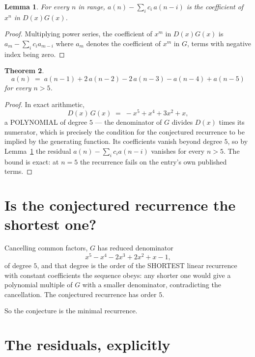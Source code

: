 \documentclass[11pt,a4paper]{article}
\theoremstyle{plain}
\newtheorem{theorem}{Theorem}
\newtheorem{lemma}[theorem]{Lemma}
\theoremstyle{definition}
\begin{document}
\begin{lemma}\label{lem:key}
For every $n$ in range, $a(n)-\sum_i c_i\,a(n-i)$ is the coefficient of $x^{n}$ in
$D(x)G(x)$.
\end{lemma}

\begin{proof}
Multiplying power series, the coefficient of $x^{m}$ in $D(x)G(x)$ is
$a_m-\sum_i c_i a_{m-i}$ where $a_m$ denotes the coefficient of $x^{m}$ in $G$, terms with
negative index being zero.
\end{proof}

\begin{theorem}
\[
a(n)\;=\;a(n-1) + 2\,a(n-2) - 2\,a(n-3) - a(n-4) + a(n-5)
\]
for every $n>5$.
\end{theorem}

\begin{proof}
In exact arithmetic,
\[
D(x)\,G(x)\;=\;- x^{5} + x^{4} + 3 x^{2} + x,
\]
a POLYNOMIAL of degree $5$ --- the denominator of $G$ divides $D(x)$ times its numerator,
which is precisely the condition for the conjectured recurrence to be implied by the
generating function. Its coefficients vanish beyond degree $5$, so by
Lemma~\ref{lem:key} the residual $a(n)-\sum_ic_ia(n-i)$ vanishes for every
$n>5$. The bound is exact: at $n=5$ the recurrence fails on the entry's own published terms.
\end{proof}

\section{Is the conjectured recurrence the shortest one?}

Cancelling common factors, $G$ has reduced denominator
\[
x^{5} - x^{4} - 2 x^{3} + 2 x^{2} + x - 1,
\]
of degree $5$, and that degree is the order of the SHORTEST linear recurrence with
constant coefficients the sequence obeys: any shorter one would give a polynomial multiple of
$G$ with a smaller denominator, contradicting the cancellation. The conjectured recurrence has
order $5$.

So the conjecture is the minimal recurrence.

\section{The residuals, explicitly}
\end{document}
